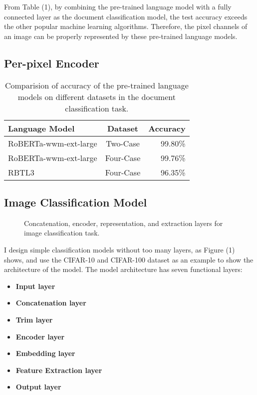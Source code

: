 \documentclass[10pt,twocolumn,letterpaper]{article}
\begin{document}
From Table (1), by combining the pre-trained language model with a fully connected layer as the document classification model,
the test accuracy exceeds the other popular machine learning algorithms.
Therefore, the pixel channels of an image can be properly represented by these pre-trained language models.

\subsection{Per-pixel Encoder}

\begin{table}
\begin{center}
\begin{tabular}{|l|c|r|}
\hline
Language Model 	& Dataset & Accuracy \\
\hline\hline
RoBERTa-wwm-ext-large & Two-Case	&	99.80\% \\
RoBERTa-wwm-ext-large & Four-Case	&	99.76\% \\
RBTL3  & Four-Case	&	96.35\% \\
\hline
\end{tabular}
\end{center}
\caption{Comparision of accuracy of the pre-trained language models on different datasets in the document classification task.}
\end{table}


\subsection{Image Classification Model}

\begin{figure*}
\begin{center}
\end{center}
   \caption{Concatenation, encoder, representation, and extraction layers for image classification task.}
\label{fig:short}
\end{figure*}

I design simple classification models without too many layers, as Figure (1) shows,
and use the CIFAR-10 and CIFAR-100 dataset as an example to show the architecture of the model.
The model architecture has seven functional layers:

\begin{itemize}
\item {\bf Input layer}
\item {\bf Concatenation layer}
\item {\bf Trim layer}
\item {\bf Encoder layer}
\item {\bf Embedding layer}
\item {\bf Feature Extraction layer}
\item {\bf Output layer}
\end{itemize}
\end{document}
